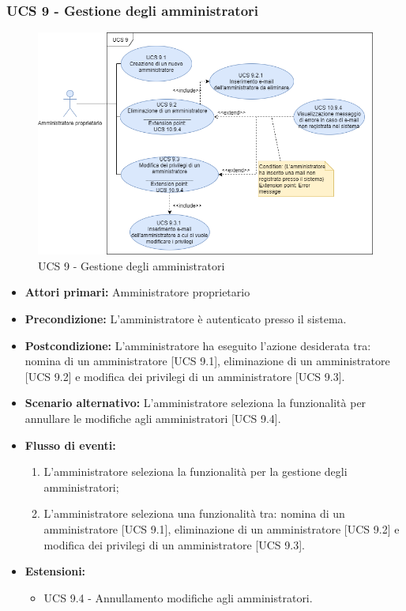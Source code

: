\subsubsection{UCS 9 - Gestione degli amministratori}%
\begin{figure}[h]
    \centering
      \includegraphics[scale=0.5]{Sezioni/UseCase/Immagini/UCS9.png}
    \caption{UCS 9 - Gestione degli amministratori}
  \end{figure}
\begin{itemize}
\item \textbf{Attori primari:} Amministratore proprietario
\item \textbf{Precondizione:} L'amministratore è autenticato presso il sistema.
\item \textbf{Postcondizione:} L'amministratore ha eseguito l'azione desiderata tra: nomina di un amministratore [UCS 9.1], eliminazione di un amministratore [UCS 9.2] e modifica dei privilegi di un amministratore [UCS 9.3].
\item \textbf{Scenario alternativo:} L'amministratore seleziona la funzionalità per annullare le modifiche agli amministratori [UCS 9.4].
\item \textbf{Flusso di eventi:} %
  \begin{enumerate}
        \item L'amministratore seleziona la funzionalità per la gestione degli amministratori;
        \item L'amministratore seleziona una funzionalità tra: nomina di un amministratore [UCS 9.1], eliminazione di un amministratore [UCS 9.2] e modifica dei privilegi di un amministratore [UCS 9.3].
    \end{enumerate}
\item \textbf{Estensioni:}
	\begin{itemize}
		\item UCS 9.4 - Annullamento modifiche agli amministratori.
	\end{itemize}
\end{itemize}



